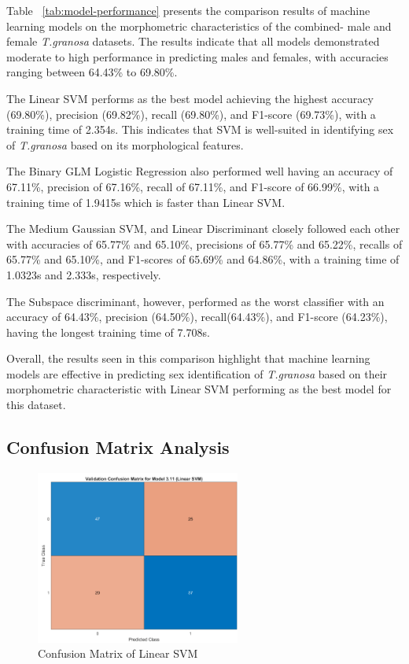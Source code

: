 Table ~\ref{tab:model-performance} presents the comparison results of machine learning models on the morphometric characteristics of the combined- male and female \textit{T.granosa} datasets. The results indicate that all models demonstrated moderate to high performance in predicting males and females, with accuracies ranging between 64.43\% to 69.80\%. 

The Linear SVM performs as the best model achieving the highest accuracy (69.80\%), precision (69.82\%), recall (69.80\%), and F1-score (69.73\%), with a training time of 2.354s. This indicates that SVM is well-suited in identifying sex of \textit{T.granosa} based on its morphological features. 

The Binary GLM Logistic Regression also performed well having an accuracy of 67.11\%, precision of 67.16\%, recall of 67.11\%, and F1-score of 66.99\%, with a training time of 1.9415s which is faster than Linear SVM. 

The Medium Gaussian SVM, and Linear Discriminant closely followed each other with accuracies of 65.77\% and 65.10\%, precisions of 65.77\% and 65.22\%, recalls of 65.77\% and 65.10\%, and F1-scores of 65.69\% and 64.86\%, with a training time of 1.0323s and 2.333s, respectively. 

The Subspace discriminant, however, performed as the worst classifier with an accuracy of 64.43\%, precision (64.50\%), recall(64.43\%), and F1-score (64.23\%), having the longest training time of 7.708s. 

Overall, the results seen in this comparison highlight that machine learning models are effective in predicting sex identification of \textit{T.granosa} based on their morphometric characteristic with Linear SVM performing as the best model for this dataset. 


\subsection{Confusion Matrix Analysis}
\begin{figure}[!htbp]
	\centering
	\includegraphics[width=0.6\textwidth]{figures/confusion-matrix.png}
	\caption{Confusion Matrix of Linear SVM}
	\label{fig:confusion-matrix}
\end{figure}

